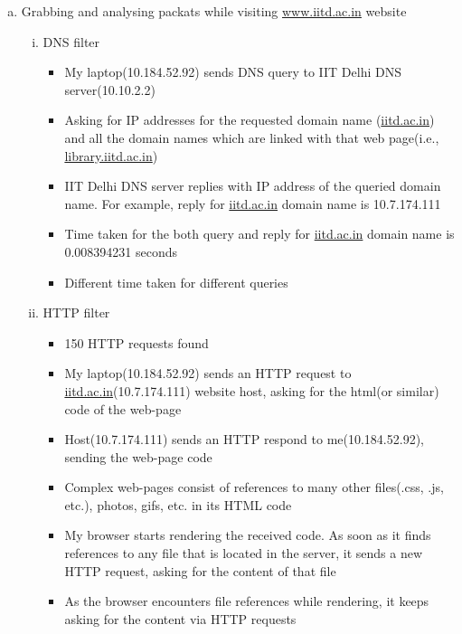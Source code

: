 \documentclass{article}
\begin{document}
    \begin{enumerate}[a)]
        \item Grabbing and analysing packats while visiting \href{www.iitd.ac.in}{www.iitd.ac.in} website
            \begin{enumerate}[i)]
                \item DNS filter
                    \begin{itemize}
                        \item My laptop(10.184.52.92) sends DNS query to IIT Delhi DNS server(10.10.2.2)
                        \item Asking for IP addresses for the requested domain name (\href{www.iitd.ac.in}{iitd.ac.in}) and all the domain names which are linked with that web page(i.e., \href{www.library.iitd.ac.in}{library.iitd.ac.in})
                        \item IIT Delhi DNS server replies with IP address of the queried domain name. For example, reply for \href{www.iitd.ac.in}{iitd.ac.in} domain name is 10.7.174.111
                        \item Time taken for the both query and reply for \href{www.iitd.ac.in}{iitd.ac.in} domain name is 0.008394231 seconds
                        \item Different time taken for different queries
                    \end{itemize}{}
                \item HTTP filter
                    \begin{itemize}
                        \item 150 HTTP requests found
                        \item My laptop(10.184.52.92) sends an HTTP request to \href{www.iitd.ac.in}{iitd.ac.in}(10.7.174.111) website host, asking for the html(or similar) code of the web-page
                        \item Host(10.7.174.111) sends an HTTP respond to me(10.184.52.92), sending the web-page code
                        \item Complex web-pages consist of references to many other files(.css, .js, etc.), photos, gifs,  etc. in its HTML code
                        \item My browser starts rendering the received code. As soon as it finds references to any file that is located in the server, it sends a new HTTP request, asking for the content of that file
                        \item As the browser encounters file references while rendering, it keeps asking for the content via HTTP requests

\end{itemize}
\end{enumerate}
\end{enumerate}
\end{document}
